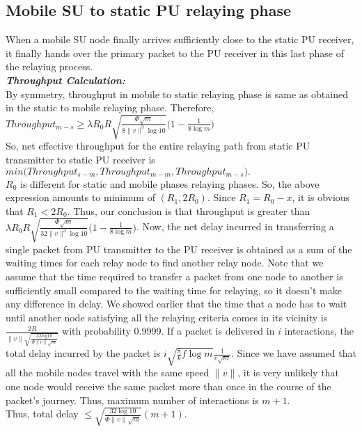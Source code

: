 \documentclass[conference]{IEEEtran}
\begin{document}
\subsection{Mobile SU to static PU relaying phase}
When a mobile SU node finally arrives sufficiently close to the static PU receiver, it finally hands over the primary packet to the PU receiver in this last phase of the relaying process.\\
\emph{\bf Throughput Calculation:}\\
By symmetry, throughput in mobile to static relaying phase is same as obtained in the static to mobile relaying phase. Therefore, 
\\$Throughput_{m-s} \geq 
\lambda R_0 R \sqrt{\frac{\Phi\sqrt{m}}{8\|v\|^3\log 10}}\big(1-\frac{1}{8\log m}\big)$\\
So, net effective throughput for the entire relaying path from static PU transmitter to static PU receiver is $min\big(Throughput_{s-m}, Throughput_{m-m},Throughput_{m-s}\big).$\\
$R_0$ is different for static and mobile phases relaying phases. So, the above expression amounts to minimum of $(R_1,2R_0)$. Since $R_1 = R_0-x$, it is obvious that $R_1<2R_0$. Thus, 
our conclusion is that throughput is greater than $\lambda R_0 R \sqrt{\frac{\Phi\sqrt{m}}{32\|v\|^3\log 10}}\big(1-\frac{1}{8\log m}\big)$. Now, the net delay incurred in transferring 
a single packet from PU transmitter to the PU receiver is obtained as a 
sum of the waiting times for each relay node to find another relay node. Note that we assume that the time required to 
transfer a packet from one node to another is sufficiently small compared to the waiting time for relaying, so it 
doesn't make any difference in delay. We showed earlier that the time that a node has to wait until another node 
satisfying all the relaying criteria comes in its vicinity is $\frac{2R}{{\|v\|}\sqrt{\frac{32log 10}{\Phi{\|v\|} \sqrt{m}}}}$ with probability 0.9999. If a packet is delivered 
in $i$ interactions, the total delay incurred by the packet is $i\sqrt{\frac{8}{k}f\log m}\frac{1}{v\sqrt{m}}$. Since we have assumed that all the mobile nodes travel with the same 
speed $\|v\|$, it is very unlikely that one node would receive the same packet more than once in the course of the packet's journey. Thus, maximum number of interactions is $m+1$.\\
Thus, total delay $\leq\sqrt{\frac{32\log 10}{\Phi\|v\|\sqrt{m}}}(m+1)$.
\end{document}
